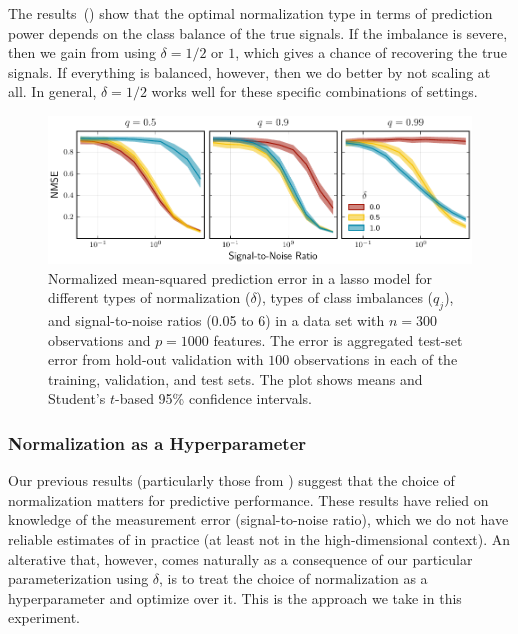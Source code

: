 The results~() show that the optimal normalization type in terms of
prediction power depends on the class balance of the true signals. If the imbalance is
severe, then we gain from using \(\delta=1/2\) or \(1\), which gives a chance of recovering
the true signals. If everything is balanced, however, then we do better by not scaling at
all. In general, \(\delta=1/2\) works well for these specific combinations of settings.

\begin{figure}[htpb]
  \centering
  \includegraphics[]{plots/binary_data_sim.pdf}
  \caption{%
    Normalized mean-squared prediction error in a lasso model for different types of normalization (\(\delta\)), types of class imbalances (\(q_j\)), and signal-to-noise ratios (0.05 to 6) in a data set with \(n=300\) observations and \(p = \num{1000}\) features. The error is aggregated test-set error from hold-out validation with \(100\) observations in each of the training, validation, and test sets. The plot shows means and Student's \(t\)-based 95\% confidence intervals.
  }
  \label{fig:binary-sim}
\end{figure}

\subsubsection{Normalization as a Hyperparameter}\label{sec:experiments-hyperparameter}


Our previous results (particularly those from ) suggest
that the choice of normalization matters for predictive performance. These results have
relied on knowledge of the measurement error (signal-to-noise ratio), which we do not have
reliable estimates of in practice (at least not in the high-dimensional context). An
alterative that, however, comes naturally as a consequence of our particular
parameterization using \(\delta\), is to treat the choice of normalization as a
hyperparameter and optimize over it. This is the approach we take in this experiment.

